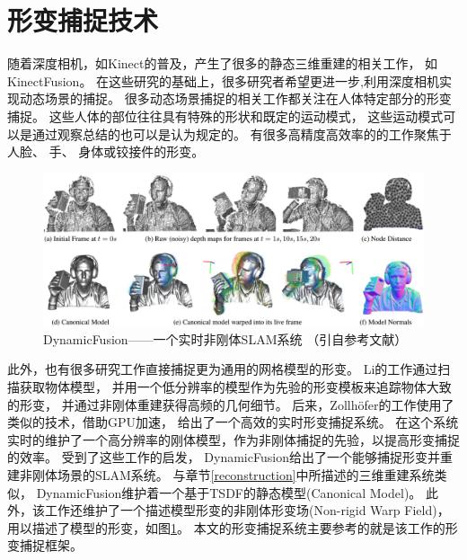 \section{形变捕捉技术}
随着深度相机，如Kinect\cite{microsoft_kinect}的普及，产生了很多的静态三维重建的相关工作，
如KinectFusion\cite{newcombe2011kinectfusion}。
在这些研究的基础上，很多研究者希望更进一步,利用深度相机实现动态场景的捕捉。
很多动态场景捕捉的相关工作都关注在人体特定部分的形变捕捉。
这些人体的部位往往具有特殊的形状和既定的运动模式，
这些运动模式可以是通过观察总结的也可以是认为规定的。
有很多高精度高效率的的工作聚焦于人脸\cite{cao20133d}\cite{li2013realtime}、
手\cite{oikonomidis2011efficient}\cite{qian2014realtime}、
身体\cite{taylor2012vitruvian}或铰接件\cite{schmidt2014dart}\cite{ye2014real}的形变。
\begin{figure}[h]
    \centering
    \includegraphics[width = \textwidth]{./Pictures/dynamic_fusion.eps}
    \caption{DynamicFusion——一个实时非刚体SLAM系统
        （引自参考文献\cite{newcombe2015dynamicfusion}）}
    \label{dynamic_fusion}
\end{figure}

此外，也有很多研究工作直接捕捉更为通用的网格模型的形变。
Li的工作\cite{li2009robust}通过扫描获取物体模型，
并用一个低分辨率的模型作为先验的形变模板来追踪物体大致的形变，
并通过非刚体重建获得高频的几何细节。
后来，Zollh{\"o}fer\cite{zollhofer2014real}的工作使用了类似的技术，借助GPU加速，
给出了一个高效的实时形变捕捉系统。
在这个系统实时的维护了一个高分辨率的刚体模型，作为非刚体捕捉的先验，以提高形变捕捉的效率。
受到了这些工作的启发，
DynamicFusion\cite{newcombe2015dynamicfusion}给出了一个能够捕捉形变并重建非刚体场景的SLAM系统。
与章节\ref{reconstruction}中所描述的三维重建系统类似，
DynamicFusion维护着一个基于TSDF的静态模型(Canonical Model)。
此外，该工作还维护了一个描述模型形变的非刚体形变场(Non-rigid Warp Field)，
用以描述了模型的形变，如图\ref{dynamic_fusion}。
本文的形变捕捉系统主要参考的就是该工作的形变捕捉框架。
